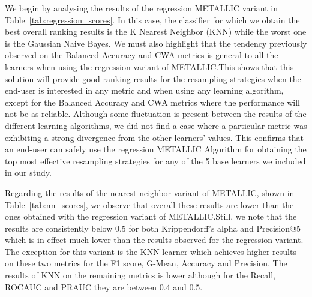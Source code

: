\documentclass{article}
\begin{document}
We begin by analysing the results of the regression METALLIC variant in Table~\autoref{tab:regression_scores}. In this case, the classifier for which we obtain the best overall ranking results is the K Nearest Neighbor (KNN) while the worst one is the Gaussian Naive Bayes. We must also highlight that the tendency previously observed on the Balanced Accuracy and CWA metrics is general to all the learners when using the regression variant of METALLIC.\@ This shows that this solution will provide good ranking results for the resampling strategies when the end-user is interested in any metric and when using any learning algorithm, except for the Balanced Accuracy and CWA metrics where the performance will not be as reliable. Although some fluctuation is present between the results of the different learning algorithms, we did not find a case where a particular metric was exhibiting a strong divergence from the other learners' values. This confirms that an end-user can safely use the regression METALLIC Algorithm for obtaining the top most effective resampling strategies for any of the 5 base learners we included in our study.


Regarding the results of the nearest neighbor variant of METALLIC, shown in Table~\autoref{tab:nn_scores}, we observe that overall these results are lower than the ones obtained with the regression variant of METALLIC.\@ Still, we note that the results are consistently below 0.5 for both Krippendorff's alpha and Precision@5 which is in effect much lower than the results observed for the regression variant. The exception for this variant is the KNN learner which achieves higher results on these two metrics for the F1 score, G-Mean, Accuracy and Precision. The results of KNN on the remaining metrics is lower although for the Recall, ROCAUC and PRAUC they are between 0.4 and 0.5.\@
\end{document}
